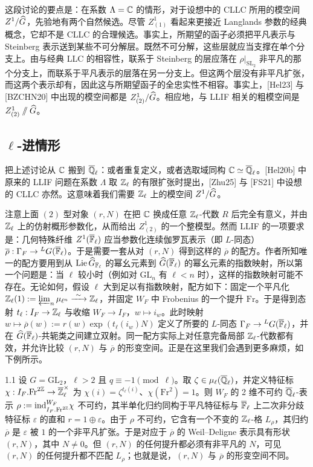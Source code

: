 这段讨论的要点是：在系数 $\Lambda=\mathbb{C}$ 的情形，对于设想中的 CLLC 所用的模空间 $Z^1/\widehat{G}$，先验地有两个自然候选。尽管 $Z^1_{(1)}$ 看起来更接近 Langlands 参数的经典概念，它却不是 CLLC 的合理候选。事实上，所期望的函子必须把平凡表示与 Steinberg 表示送到某些不可分解层。既然不可分解，这些层就应当支撑在单个分支上。由与经典 LLC 的相容性，联系于 Steinberg 的层应落在 $\rho|_{\mathrm{SL}_2}$ 非平凡的那个分支上，而联系于平凡表示的层落在另一分支上。但这两个层没有非平凡扩张，而这两个表示却有，因此这与所期望函子的全忠实性不相容。事实上，[Hel23] 与 [BZCHN20] 中出现的模空间都是 $Z^1_{(2)}/\widehat{G}$。相应地，与 LLIF 相关的粗模空间是 $Z^1_{(2)}\sslash\widehat{G}$。

\subsection{$\ell$-进情形}

把上述讨论从 $\mathbb{C}$ 搬到 $\overline{\mathbb{Q}}_\ell$：或者重复定义，或者选取域同构 $\mathbb{C}\simeq\overline{\mathbb{Q}}_\ell$。[Hel20b] 中原来的 LLIF 问题在系数 $\Lambda$ 取 $\mathbb{Z}_\ell$ 的有限扩张时提出，[Zhu25] 与 [FS21] 中设想的 CLLC 亦然。这意味着我们需要 $\mathbb{Z}_\ell$ 上的模空间 $Z^1/\widehat{G}$。

注意上面 $(2)$ 型对象 $(r,N)$ 在把 $\mathbb{C}$ 换成任意 $\mathbb{Z}_\ell$-代数 $R$ 后完全有意义，并由 $\mathbb{Z}_\ell$ 上的仿射概形参数化，从而给出 $Z^1_{(2)}$ 的一个整模型。然而 LLIF 的一项要求是：几何特殊纤维 $Z^1(\overline{\mathbb{F}}_\ell)$ 应当参数化连续伽罗瓦表示（即 $L$-同态）$\overline\rho:\Gamma_F\to{}^LG(\overline{\mathbb{F}}_\ell)$。于是需要一套从对 $(r,N)$ 得到这样的 $\overline\rho$ 的配方。作者所知唯一的配方要用到从 $\mathrm{Lie}\,\widehat{G}_{\mathbb{F}_\ell}$ 的幂幺元素到 $\widehat{G}(\overline{\mathbb{F}}_\ell)$ 的幂幺元素的指数映射，所以第一个问题是：当 $\ell$ 较小时（例如对 $\mathrm{GL}_n$ 有 $\ell<n$ 时），这样的指数映射可能不存在。无论如何，假设 $\ell$ 大到足以有指数映射，配方如下：固定一个平凡化 $\mathbb{Z}_\ell(1):=\varprojlim_n\mu_{\ell^n}\xrightarrow{\ \sim\ }\mathbb{Z}_\ell$，并固定 $W_F$ 中 Frobenius 的一个提升 $\mathrm{Fr}$。于是得到态射 $t_\ell:I_F\to\mathbb{Z}_\ell$ 与收缩 $W_F\to I_F$，$w\mapsto i_w$。此时映射 $w\mapsto\overline\rho(w):=r(w)\exp(t_\ell(i_w)N)$ 定义了所要的 $L$-同态 $\Gamma_F\to{}^LG(\overline{\mathbb{F}}_\ell)$，并在 $\widehat{G}(\overline{\mathbb{F}}_\ell)$-共轭类之间建立双射。同一配方实际上对任意完备局部 $\mathbb{Z}_\ell$-代数都有效，并允许比较 $(r,N)$ 与 $\overline\rho$ 的形变空间。正是在这里我们会遇到更多麻烦，如下例所示。

\begin{exam}{1.1}
设 $G=\mathrm{GL}_2$，$\ell>2$ 且 $q\equiv-1\pmod\ell$。取 $\zeta\in\mu_\ell(\overline{\mathbb{Q}}_\ell)$，并定义特征标 $\chi:I_F.\mathrm{Fr}^{2\mathbb{Z}}\to\overline{\mathbb{Z}}_\ell^\times$ 为 $\chi(i)=\zeta^{t_\ell(i)}$、$\chi(\mathrm{Fr}^2)=1$。则 $W_F$ 的 2 维不可约 $\overline{\mathbb{Q}}_\ell$-表示 $\rho:=\mathrm{ind}_{I_F.\mathrm{Fr}^{2\mathbb{Z}}}^{W_F}\chi$ 不可约，其半单化归约同构于平凡特征标与 $\overline{\mathbb{F}}_\ell$ 上二次非分歧特征标 $\varepsilon$ 的直和 $r=1\oplus\varepsilon$。由于 $\rho$ 不可约，它含有一个不变的 $\mathbb{Z}_\ell$-格 $L_\rho$，其归约 $\overline\rho$ 是 $\varepsilon$ 被 $1$ 的一个非平凡扩张。于是对应于 $\overline\rho$ 的 Weil–Deligne 表示具有形状 $(r,N)$，其中 $N\ne0$。但 $(r,N)$ 的任何提升都必须有非平凡的 $N$，可见 $(r,N)$ 的任何提升都不匹配 $L_\rho$；也就是说，$(r,N)$ 与 $\overline\rho$ 的形变空间不同。
\end{exam}

